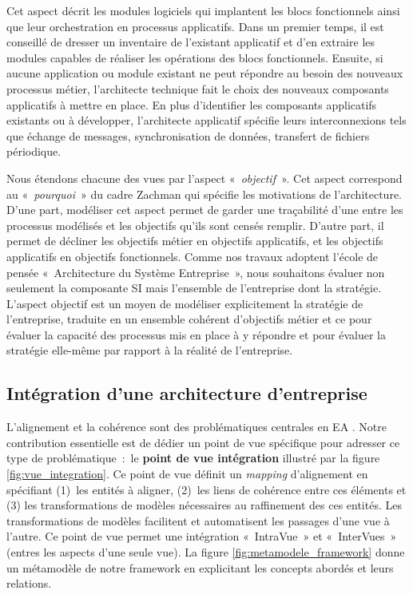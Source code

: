 {\begin{itemize}
	Cet aspect décrit les modules logiciels qui implantent les blocs fonctionnels 
ainsi que leur orchestration en processus applicatifs. Dans un premier temps, il 
est conseillé de dresser un inventaire de l'existant applicatif et d'en extraire 
les modules capables de réaliser les opérations des blocs fonctionnels. Ensuite, 
si aucune application ou module existant ne peut répondre au besoin des nouveaux 
processus métier, l'architecte technique fait le choix des nouveaux composants 
applicatifs à mettre en place. En plus d'identifier les composants applicatifs 
existants ou à développer, l'architecte applicatif spécifie leurs 
interconnexions tels que échange de messages, synchronisation de données, 
transfert de fichiers périodique.
	\end{itemize}
	
Nous étendons chacune des vues par l'aspect «~\textit{objectif}~». Cet aspect 
correspond au «~\textit{pourquoi}~» du cadre Zachman qui spécifie les 
motivations de l'architecture. D'une part, modéliser cet aspect permet de garder 
une traçabilité d'une entre les processus modélisés et les objectifs qu'ils sont 
censés remplir. D'autre part, il permet de décliner les objectifs métier en 
objectifs applicatifs, et les objectifs applicatifs en objectifs fonctionnels. 
Comme nos travaux adoptent l'école de pensée «~Architecture du Système 
Entreprise~», nous souhaitons évaluer non seulement la composante SI mais 
l'ensemble de l'entreprise dont la stratégie. L'aspect objectif est un moyen de 
modéliser explicitement la stratégie de l'entreprise, traduite en un ensemble 
cohérent d'objectifs métier et ce pour évaluer la capacité des processus mis en 
place à y répondre et pour évaluer la stratégie elle-même par rapport à la 
réalité de l'entreprise. 

\subsection{Intégration d'une architecture d'entreprise} 

L'alignement et la cohérence sont des problématiques centrales en EA 
\cite{kaisler_enterprise_2005}. Notre contribution essentielle est de dédier un 
point de vue spécifique pour adresser ce type de problématique~:~le 
\textbf{point de vue intégration} illustré par la figure 
\ref{fig:vue_integration}. Ce point de vue définit un \textit{mapping} 
d'alignement en spécifiant (1)~les entités à aligner, (2)~les liens de cohérence 
entre ces éléments et (3) les transformations de modèles nécessaires au 
raffinement des ces entités. Les transformations de modèles facilitent et 
automatisent les passages d'une vue à l'autre. Ce point de vue permet une 
intégration «~IntraVue~» et «~InterVues~» (entres les aspects d'une seule vue). 
La figure \ref{fig:metamodele_framework} donne un métamodèle de notre framework 
en explicitant les concepts abordés et leurs relations.

}
